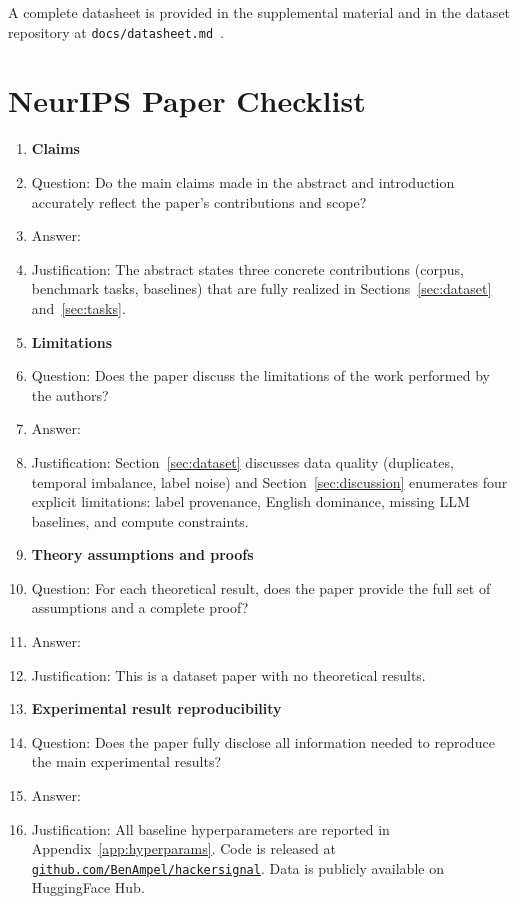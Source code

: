 \documentclass{article}
\begin{document}
A complete datasheet is provided in the supplemental material and in the dataset repository at \texttt{docs/datasheet.md}~\citep{gebru2021datasheet}.

\newpage
\section*{NeurIPS Paper Checklist}

\begin{enumerate}

\item {\bf Claims}
    \item[] Question: Do the main claims made in the abstract and introduction accurately reflect the paper's contributions and scope?
    \item[] Answer: \answerYes{}
    \item[] Justification: The abstract states three concrete contributions (corpus, benchmark tasks, baselines) that are fully realized in Sections~\ref{sec:dataset} and~\ref{sec:tasks}.

\item {\bf Limitations}
    \item[] Question: Does the paper discuss the limitations of the work performed by the authors?
    \item[] Answer: \answerYes{}
\item[] Justification: Section~\ref{sec:dataset} discusses data quality (duplicates, temporal imbalance, label noise) and Section~\ref{sec:discussion} enumerates four explicit limitations: label provenance, English dominance, missing LLM baselines, and compute constraints.

\item {\bf Theory assumptions and proofs}
    \item[] Question: For each theoretical result, does the paper provide the full set of assumptions and a complete proof?
    \item[] Answer: \answerNA{}
    \item[] Justification: This is a dataset paper with no theoretical results.

\item {\bf Experimental result reproducibility}
    \item[] Question: Does the paper fully disclose all information needed to reproduce the main experimental results?
    \item[] Answer: \answerYes{}
    \item[] Justification: All baseline hyperparameters are reported in Appendix~\ref{app:hyperparams}. Code is released at \href{https://github.com/BenAmpel/hackersignal}{\texttt{github.com/BenAmpel/hackersignal}}. Data is publicly available on HuggingFace Hub.


\end{enumerate}
\end{document}
